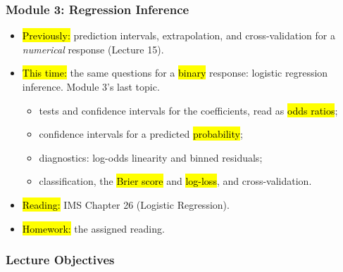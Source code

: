 

\begin{frame}
\frametitle{Module 3: Regression Inference}
    \begin{itemize}
        \item \hl{Previously:} prediction intervals, extrapolation, and cross-validation for a \emph{numerical} response (Lecture 15).
        \item \hl{This time:} the same questions for a \hl{binary} response: logistic regression inference. Module 3's last topic.
          \begin{itemize}
              \item tests and confidence intervals for the coefficients, read as \hl{odds ratios};
              \item confidence intervals for a predicted \hl{probability};
              \item diagnostics: log-odds linearity and binned residuals;
              \item classification, the \hl{Brier score} and \hl{log-loss}, and cross-validation.
          \end{itemize}
        \item \hl{Reading:} IMS Chapter 26 (Logistic Regression).
        \item \hl{Homework:} the assigned reading.
    \end{itemize}
\end{frame}


\begin{frame}
    \frametitle{Lecture Objectives}
\end{frame}


